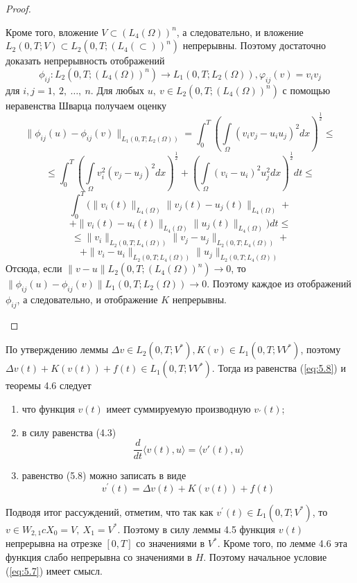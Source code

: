 \begin{proof}
\begin{enumerate}
        Кроме того, вложение $V \subset (L_4(\Omega))^n$, а следовательно, и вложение $L_2(0, T; V) \subset L_2(0, T; (L_4(\subset))^n)$
        непрерывны. Поэтому достаточно доказать непрерывность отображений
        $$\phi_{ij}: L_2(0, T; (L_4(\Omega))^n) \rightarrow L_1(0, T; L_2(\Omega)), \varphi_{ij}(v) = v_i v_j$$
        для $i, j = 1, \ 2, \ \dots, \ n$.
        Для любых $u, \ v \in L_2(0, T; (L_4(\Omega))^n)$ с помощью неравенства Шварца получаем оценку
        $$\parallel\phi_{ij}(u)-\phi_{ij}(v)\parallel_{L_1(0,T;L_2(\Omega))}=\int_0^T(\int\limits_\Omega(v_iv_j-u_iu_j)^2dx)^\frac{1}{2}\le$$
        $$\le\int_0^T(\int\limits_\Omega v_i^2(v_j-u_j)^2dx)^\frac{1}{2}+(\int\limits_\Omega (v_i-u_i)^2u_j^2dx)^\frac{1}{2}dt\le$$
        $$\int_0^T(\parallel v_i(t)\parallel_{L_4(\Omega)}\parallel v_j(t)-u_j(t)\parallel_{L_4(\Omega)}+$$
        $$+\parallel v_i(t)-u_i(t)\parallel_{L_4(\Omega)}\parallel u_j(t)\parallel_{L_4(\Omega)})dt\le$$
        $$\le\parallel v_i\parallel_{L_2(0,T;L_4(\Omega))}\parallel v_j-u_j\parallel_{L_2(0,T;L_4(\Omega))}+$$
        $$+\parallel v_i-u_i\parallel_{L_2(0,T;L_4(\Omega))}\parallel u_j\parallel_{L_2(0,T;L_4(\Omega))}$$
        Отсюда, если
        $\parallel v - u \parallel L_2(0, T; (L_4(\Omega))^n) \rightarrow 0$,
        то $\parallel \phi_{ij}(u) - \phi_{ij}(v) \parallel L_1(0, T; L_2(\Omega)) \rightarrow 0$.
        Поэтому каждое из отображений $\phi_{ij}$, а следовательно, и отображение $K$ непрерывны.
    \end{enumerate}
\end{proof}

По утверждению леммы $\Delta v \in L_2(0, T; V^\ast), K(v) \in L_1(0, T; VV^\ast)$, поэтому $\Delta v(t) + K(v(t)) + f(t) \in L_1(0, T; VV^\ast)$.
Тогда из равенства (\ref{eq:5.8}) и теоремы 4.6 следует
\begin{enumerate}
    \item что функция $v(t)$ имеет суммируемую производную $v_\prime(t)$;
    \item в силу равенства (4.3)
    $$\frac{d}{dt} \langle v(t),u \rangle = \langle v'(t),u \rangle $$
    \item равенство (5.8) можно записать в виде
    $$v^\prime(t)=\Delta v(t)+K(v(t))+f(t)$$
\end{enumerate}

Подводя итог рассуждений, отметим, что так как $v^\prime(t) \in L_1(0, T; V^\ast)$, то $v \in W_{2,1} c X_0 = V, \ X_1 = V^\ast$. Поэтому в силу леммы 4.5 функция
$v(t)$ непрерывна на отрезке $[0, T]$ со значениями в $V^\ast$. Кроме того, по лемме 4.6 эта функция слабо непрерывна со значениями в $H$. Поэтому
начальное условие (\ref{eq:5.7}) имеет смысл.

